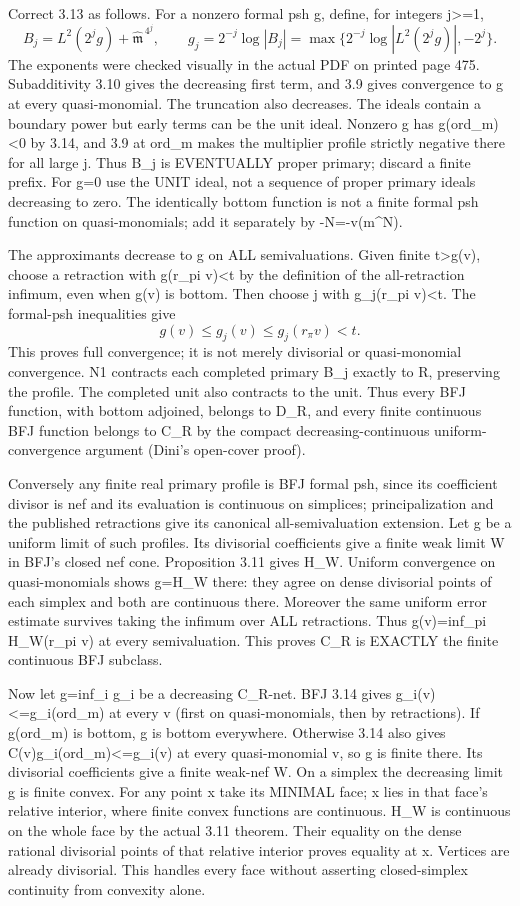 \documentclass[11pt]{article}
\begin{document}
Correct 3.13 as follows. For a nonzero formal psh g, define, for integers j>=1,
\[
B_j=L^2(2^j g)+\widehat{\mathfrak m}^{\,4^j},\qquad
g_j=2^{-j}\log|B_j|=\max\{2^{-j}\log|L^2(2^jg)|,-2^j\}.
\]
The exponents were checked visually in the actual PDF on printed page 475. Subadditivity 3.10 gives the decreasing first term, and 3.9 gives convergence to g at every quasi-monomial. The truncation also decreases. The ideals contain a boundary power but early terms can be the unit ideal. Nonzero g has g(ord\_m)<0 by 3.14, and 3.9 at ord\_m makes the multiplier profile strictly negative there for all large j. Thus B\_j is EVENTUALLY proper primary; discard a finite prefix. For g=0 use the UNIT ideal, not a sequence of proper primary ideals decreasing to zero. The identically bottom function is not a finite formal psh function on quasi-monomials; add it separately by -N=-v(m\textasciicircum{}N).

The approximants decrease to g on ALL semivaluations. Given finite t>g(v), choose a retraction with g(r\_pi v)<t by the definition of the all-retraction infimum, even when g(v) is bottom. Then choose j with g\_j(r\_pi v)<t. The formal-psh inequalities give
\[
g(v)\le g_j(v)\le g_j(r_\pi v)<t.
\]
This proves full convergence; it is not merely divisorial or quasi-monomial convergence. N1 contracts each completed primary B\_j exactly to R, preserving the profile. The completed unit also contracts to the unit. Thus every BFJ function, with bottom adjoined, belongs to D\_R, and every finite continuous BFJ function belongs to C\_R by the compact decreasing-continuous uniform-convergence argument (Dini's open-cover proof).

Conversely any finite real primary profile is BFJ formal psh, since its coefficient divisor is nef and its evaluation is continuous on simplices; principalization and the published retractions give its canonical all-semivaluation extension. Let g be a uniform limit of such profiles. Its divisorial coefficients give a finite weak limit W in BFJ's closed nef cone. Proposition 3.11 gives H\_W. Uniform convergence on quasi-monomials shows g=H\_W there: they agree on dense divisorial points of each simplex and both are continuous there. Moreover the same uniform error estimate survives taking the infimum over ALL retractions. Thus g(v)=inf\_pi H\_W(r\_pi v) at every semivaluation. This proves C\_R is EXACTLY the finite continuous BFJ subclass.

Now let g=inf\_i g\_i be a decreasing C\_R-net. BFJ 3.14 gives g\_i(v)<=g\_i(ord\_m) at every v (first on quasi-monomials, then by retractions). If g(ord\_m) is bottom, g is bottom everywhere. Otherwise 3.14 also gives C(v)g\_i(ord\_m)<=g\_i(v) at every quasi-monomial v, so g is finite there. Its divisorial coefficients give a finite weak-nef W. On a simplex the decreasing limit g is finite convex. For any point x take its MINIMAL face; x lies in that face's relative interior, where finite convex functions are continuous. H\_W is continuous on the whole face by the actual 3.11 theorem. Their equality on the dense rational divisorial points of that relative interior proves equality at x. Vertices are already divisorial. This handles every face without asserting closed-simplex continuity from convexity alone.
\end{document}
